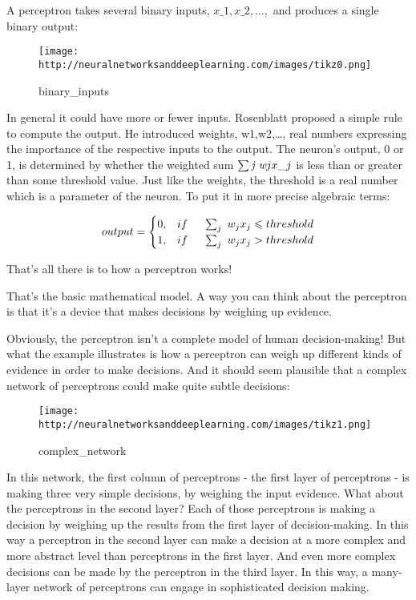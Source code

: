 \documentclass[]{article}
\begin{document}
A perceptron takes several binary inputs, $ x\_1, x\_2, \ldots{}, $
and produces a single binary output:

\begin{figure}[htbp]
\centering
\texttt{[image: http://neuralnetworksanddeeplearning.com/images/tikz0.png]}
\caption{binary\_inputs}
\end{figure}

In general it could have more or fewer inputs. Rosenblatt proposed a
simple rule to compute the output. He introduced weights,
w1,w2,\ldots{}, real numbers expressing the importance of the respective
inputs to the output. The neuron's output, 0 or 1, is determined by
whether the weighted sum $ \sum\emph{j w}jx\_j $ is less than or
greater than some threshold value. Just like the weights, the threshold
is a real number which is a parameter of the neuron. To put it in more
precise algebraic terms:

\begin{equation}
        output =
        \begin{cases}
            0,& if \hspace{0.5 cm} \sum_j\ w_jx_j \leqslant threshold \\
            1,& if \hspace{0.5 cm} \sum_j\ w_jx_j > threshold
        \end{cases}
\end{equation}

That's all there is to how a perceptron works!

That's the basic mathematical model. A way you can think about the
perceptron is that it's a device that makes decisions by weighing up
evidence.

Obviously, the perceptron isn't a complete model of human
decision-making! But what the example illustrates is how a perceptron
can weigh up different kinds of evidence in order to make decisions. And
it should seem plausible that a complex network of perceptrons could
make quite subtle decisions:

\begin{figure}[htbp]
\centering
\texttt{[image: http://neuralnetworksanddeeplearning.com/images/tikz1.png]}
\caption{complex\_network}
\end{figure}

In this network, the first column of perceptrons - the first layer of
perceptrons - is making three very simple decisions, by weighing the
input evidence. What about the perceptrons in the second layer? Each of
those perceptrons is making a decision by weighing up the results from
the first layer of decision-making. In this way a perceptron in the
second layer can make a decision at a more complex and more abstract
level than perceptrons in the first layer. And even more complex
decisions can be made by the perceptron in the third layer. In this way,
a many-layer network of perceptrons can engage in sophisticated decision
making.
\end{document}
